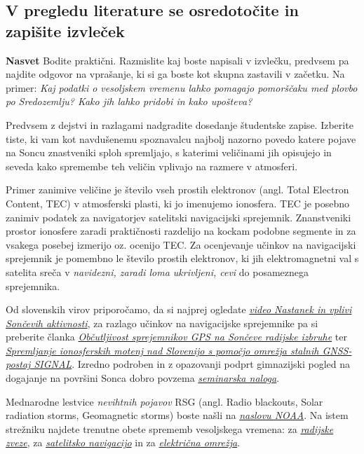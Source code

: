 \subsection{V pregledu literature se osredotočite in zapišite izvleček}
\label{subsec:VesVrem_ZapIzvlLit}

\textbf{Nasvet} Bodite praktični. Razmislite kaj boste napisali v izvlečku, predvsem pa najdite odgovor na vprašanje, ki si ga boste kot skupna zastavili v začetku. Na primer: \textit{Kaj podatki o vesoljskem vremenu lahko pomagajo pomorščaku med plovbo po Sredozemlju? Kako jih lahko pridobi in kako upošteva?}

Predvsem z dejstvi in razlagami nadgradite dosedanje študentske zapise. Izberite tiste, ki vam kot navdušenemu spoznavalcu najbolj nazorno povedo katere pojave na Soncu znastveniki sploh spremljajo, s katerimi veličinami jih opisujejo in seveda kako spremembe teh veličin vplivajo na razmere v atmosferi.

Primer zanimive veličine je število vseh prostih elektronov (angl. Total Electron Content, TEC) v atmosferski plasti, ki jo imenujemo ionosfera. TEC je posebno zanimiv podatek za navigatorjev satelitski navigacijski sprejemnik. Znanstveniki prostor ionosfere zaradi praktičnosti razdelijo na kockam podobne segmente in za vsakega posebej izmerijo oz. ocenijo TEC. Za ocenjevanje učinkov na navigacijski sprejemnik je pomembno le število prostih elektronov, ki jih elektromagnetni val s satelita sreča v \textit{navidezni, zaradi loma ukrivljeni, cevi} do posameznega sprejemnika.
      
Od slovenskih virov priporočamo, da si najprej ogledate \href{http://www.s50e.si/multimedija}{\textit{video Nastanek in vplivi Sončevih aktivnosti}}, za razlago učinkov na navigacijske sprejemnike pa si preberite članka  \href{http://www.ltfe.org/wp-content/uploads/2011/09/sternobcutljivost_sprejemnikovp.pdf}{\textit{Občutljivost sprejemnikov GPS na Sončeve radijske izbruhe}} ter \href{http://www.fgg.uni-lj.si/sugg/referati/2013/SZGG_2012_Berk_Bajec_Radovan.pdf}{\textit{Spremljanje ionosferskih motenj nad Slovenijo s pomočjo omrežja stalnih GNSS-postaj SIGNAL}}. Izredno podroben in z opazovanji podprt gimnazijski pogled na dogajanje na površini Sonca dobro povzema \href{http://www2.arnes.si/~gljsentvid10/Opazovanje_Sonceve_povrsinske_aktivnosti.pdf}{\textit{seminarska naloga}}.

Mednarodne lestvice \textit{nevihtnih pojavov} RSG (angl. Radio blackouts, Solar radiation storms, Geomagnetic storms) boste našli na \href{http://www.swpc.noaa.gov/noaa-scales-explanation}{\textit{naslovu NOAA}}. Na istem strežniku najdete trenutne obete sprememb vesoljskega vremena: za \href{http://www.swpc.noaa.gov/communities/radio-communications}{\textit{radijske zveze}}, za \href{http://www.swpc.noaa.gov/communities/global-positioning-system-gps-community-dashboard}{\textit{satelitsko navigacijo}} in za  \href{http://www.swpc.noaa.gov/communities/electric-power-community-dashboard}{\textit{električna omrežja}}.

